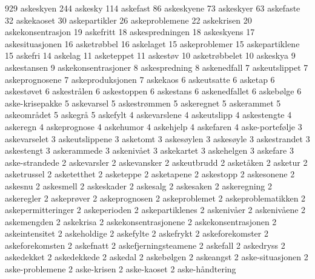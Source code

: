 929 askeskyen
244 askesky
114 askefast
86 askeskyene
73 askeskyer
63 askefaste
32 askekaoset
30 askepartikler
26 askeproblemene
22 askekrisen
20 askekonsentrasjon
19 askefritt
18 askespredningen
18 askeskyens
17 askesituasjonen
16 asketrøbbel
16 askelaget
15 askeproblemer
15 askepartiklene
15 askefri
14 askelag
11 asketeppet
11 askestøv
10 asketrøbbelet
10 askeskya
9 askestansen
9 askekonsentrasjoner
8 askespredning
8 askenedfall
7 askeutslippet
7 askeprognosene
7 askeproduksjonen
7 askekaos
6 askeutsatte
6 asketap
6 askestøvet
6 askestrålen
6 askestoppen
6 askestans
6 askenedfallet
6 askebølge
6 aske-krisepakke
5 askevarsel
5 askestrømmen
5 askeregnet
5 askerammet
5 askeområdet
5 askegrå
5 askefylt
4 askevarslene
4 askeutslipp
4 askestengte
4 askeregn
4 askeprognose
4 askehumor
4 askehjelp
4 askefaren
4 aske-portefølje
3 askevarselet
3 askeutslippene
3 asketomt
3 askesøylen
3 askesøyle
3 askestrandet
3 askestengt
3 askerammede
3 askenivået
3 askekartet
3 askehelgen
3 askefare
3 aske-strandede
2 askevarsler
2 askevansker
2 askeutbrudd
2 asketåken
2 asketur
2 asketrussel
2 asketetthet
2 asketeppe
2 asketapene
2 askestopp
2 askesonene
2 askesnu
2 askesmell
2 askeskader
2 askesalg
2 askesaken
2 askeregning
2 askeregler
2 askeprøver
2 askeprognosen
2 askeproblemet
2 askeproblematikken
2 askepermitteringer
2 askeperioden
2 askepartiklenes
2 askenivåer
2 askenivåene
2 askemengden
2 askekrisa
2 askekonsentrasjonene
2 askekonsentrasjonen
2 askeintensitet
2 askeholdige
2 askefylte
2 askefrykt
2 askeforekomster
2 askeforekomsten
2 askefnatt
2 askefjerningsteamene
2 askefall
2 askedryss
2 askedekket
2 askedekkede
2 askedal
2 askebølgen
2 askeangst
2 aske-situasjonen
2 aske-problemene
2 aske-krisen
2 aske-kaoset
2 aske-håndtering